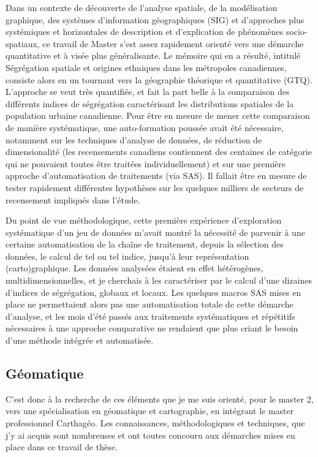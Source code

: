 Dans un contexte de découverte de l'analyse spatiale, de la modélisation graphique, des systèmes d'information géographiques (SIG) et d'approches plus systémiques et horizontales de description et d'explication de phénomènes socio-spatiaux, ce travail de Master s'est assez rapidement orienté vers une démarche quantitative et à visée plus généralisante.
Le mémoire qui en a résulté, intitulé \og Ségrégation spatiale et origines ethniques dans les métropoles canadiennes\fg{}, consiste alors en un tournant vers la géographie théorique et quantitative (GTQ).
L'approche se veut très quantifiée, et fait la part belle à la comparaison des différents indices de ségrégation caractérisant les distributions spatiales de la population urbaine canadienne.
Pour être en mesure de mener cette comparaison de manière systématique, une auto-formation poussée avait été nécessaire, notamment sur les techniques d'analyse de données, de réduction de dimensionalité (les recensements canadiens contiennent des centaines de catégorie qui ne pouvaient toutes être traitées individuellement) et sur une première approche d'automatisation de traitements (via SAS).
Il fallait être en mesure de tester rapidement différentes hypothèses sur les quelques milliers de \og secteurs de recensement\fg{} impliqués dans l'étude.

Du point de vue méthodologique, cette première expérience d'exploration systématique d'un jeu de données m'avait montré la nécessité de parvenir à une certaine automatisation de la chaîne de traitement, depuis la sélection des données, le calcul de tel ou tel indice, jusqu'à leur représentation (carto)graphique.
Les données analysées étaient en effet hétérogènes, multidimensionnelles, et je cherchais à les caractériser par le calcul d'une dizaines d'indices de ségrégation, globaux et locaux.
Les quelques macros SAS mises en place ne permettaient alors pas une automatisation totale de cette démarche d'analyse, et les mois d'été passés aux traitements systématiques et répétitifs nécessaires à une approche comparative ne rendaient que plus criant le besoin d'une méthode intégrée et automatisée.

\subsection{Géomatique}

C'est donc à la recherche de ces éléments que je me suis orienté, pour le master 2, vers une spécialisation en géomatique et cartographie, en intégrant le master professionnel Carthagéo.
Les connaissances, méthodologiques et techniques, que j'y ai acquis sont nombreuses et ont toutes concouru aux démarches mises en place dans ce travail de thèse.

